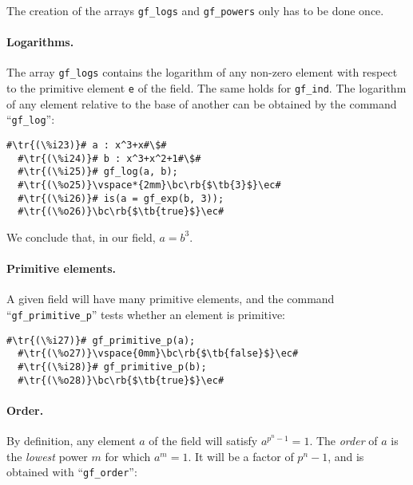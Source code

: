 \documentclass[a4paper,11pt,leqno,fleqn]{artikel3}
\newcommand{\bc}{\begin{center}}
\newcommand{\ec}{\end{center}}
\newcommand{\tr}[1]{\textcolor{red}{#1}}
\newcommand{\tb}[1]{\textcolor{blue}{#1}}
\newcommand{\rb}[1]{\raisebox{2mm}[0mm][1mm]{#1}}
\begin{document}
The creation of the arrays \texttt{gf\_logs} and \texttt{gf\_powers} 
only has to be done once.


\paragraph{Logarithms.}

The array \texttt{gf\_logs} contains the logarithm of any non-zero element 
with respect to the primitive element \texttt{e} of the field. 
The same holds for \texttt{gf\_ind}. The logarithm
of any element relative to the base of another can be obtained by the
command ``\verb!gf_log!'':

\vspace*{2mm}
\begin{lstlisting}[escapechar=\#]
  #\tr{(\%i23)}# a : x^3+x#\$#
  #\tr{(\%i24)}# b : x^3+x^2+1#\$#
  #\tr{(\%i25)}# gf_log(a, b);
  #\tr{(\%o25)}\vspace*{2mm}\bc\rb{$\tb{3}$}\ec#
  #\tr{(\%i26)}# is(a = gf_exp(b, 3));
  #\tr{(\%o26)}\bc\rb{$\tb{true}$}\ec#
\end{lstlisting}

We conclude that, in our field, $a=b^{3}$.


\paragraph{Primitive elements.}

A given field will have many primitive elements, and the command \\
``\verb!gf_primitive_p!'' tests whether an element is primitive:

\vspace*{2mm}
\begin{lstlisting}[escapechar=\#]
  #\tr{(\%i27)}# gf_primitive_p(a);
  #\tr{(\%o27)}\vspace{0mm}\bc\rb{$\tb{false}$}\ec#
  #\tr{(\%i28)}# gf_primitive_p(b);
  #\tr{(\%o28)}\bc\rb{$\tb{true}$}\ec#
\end{lstlisting}


\paragraph{Order.}

By definition, any element $a$ of the field will satisfy $a^{p^n-1}=1$.  The
\emph{order} of $a$ is the \emph{lowest} power $m$ for which $a^m=1$.  It will
be a factor of $p^n-1$, and is obtained with ``\verb!gf_order!'':
\end{document}
